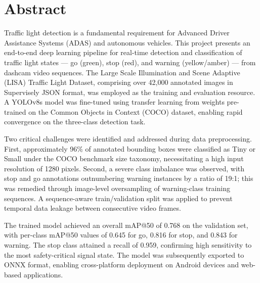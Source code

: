 
\chapter*{Abstract}

Traffic light detection is a fundamental requirement for Advanced Driver Assistance Systems (ADAS) and autonomous vehicles. This project presents an end-to-end deep learning pipeline for real-time detection and classification of traffic light states — go (green), stop (red), and warning (yellow/amber) — from dashcam video sequences. The Large Scale Illumination and Scene Adaptive (LISA) Traffic Light Dataset, comprising over 42,000 annotated images in Supervisely JSON format, was employed as the training and evaluation resource. A YOLOv8s model was fine-tuned using transfer learning from weights pre-trained on the Common Objects in Context (COCO) dataset, enabling rapid convergence on the three-class detection task.

Two critical challenges were identified and addressed during data preprocessing. First, approximately 96\% of annotated bounding boxes were classified as Tiny or Small under the COCO benchmark size taxonomy, necessitating a high input resolution of 1280 pixels. Second, a severe class imbalance was observed, with stop and go annotations outnumbering warning instances by a ratio of 19:1; this was remedied through image-level oversampling of warning-class training sequences. A sequence-aware train/validation split was applied to prevent temporal data leakage between consecutive video frames.

The trained model achieved an overall mAP@50 of 0.768 on the validation set, with per-class mAP@50 values of 0.645 for go, 0.816 for stop, and 0.843 for warning. The stop class attained a recall of 0.959, confirming high sensitivity to the most safety-critical signal state. The model was subsequently exported to ONNX format, enabling cross-platform deployment on Android devices and web-based applications.

